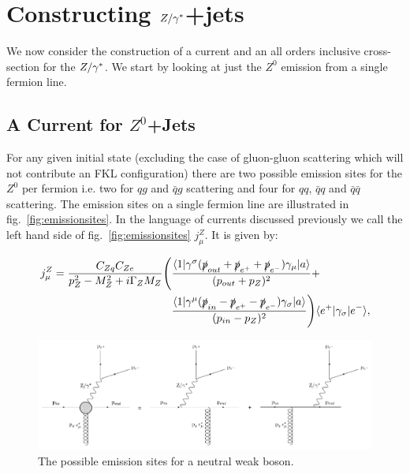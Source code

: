 \section{Constructing $Z/\gamma^*$+jets}
	\label{sec:Zcurrents}

	We now consider the construction of a current and an all orders
	inclusive cross-section for the $Z/\gamma^*$.  We start by looking at just
	the $Z^0$ emission from a single fermion line.

	\subsection{A Current for $Z^0$+Jets}
		\label{sub:zCurrent}

		For any given initial state (excluding the case of gluon-gluon scattering which will
		not contribute an FKL configuration) there are two possible emission sites for the
		$Z^0$ per fermion i.e. two for $qg$ and $\bar qg$ scattering and four for $qq$,
		$\bar qq$ and $\bar q\bar q$ scattering. The emission sites on a single fermion line
		are illustrated in fig.~\eqref{fig:emissionsites}.  In the language of currents discussed
		previously we call the left hand side of fig.~\eqref{fig:emissionsites} $j_\mu^{Z}$.
		It is given by:

		\begin{align}
		  \begin{split}
		    j^Z_\mu = \frac{C_{Zq}C_{Ze}}{p_Z^2 - M^2_Z +
		      i\Gamma_ZM_Z}\Bigg(&\frac{\langle 1 | \gamma^{\sigma}(\slashed p_{out} + \slashed
		        p_{e^+} + \slashed p_{e^-})\gamma_{\mu} | a \rangle}{(p_{out} + p_Z)^2} + \\
		    &\frac{\langle 1 | \gamma^{\mu}(\slashed p_{in} - \slashed p_{e^+} - \slashed
		        p_{e^-})\gamma_{\sigma} | a \rangle}{(p_{in} - p_Z)^2}\Bigg)\langle e^+ | \gamma_{\sigma} | e^- \rangle,
		    \label{eqn:Zcurrent}
		  \end{split}
		\end{align}

		\begin{figure}[bt]
			\includegraphics[width=0.98\linewidth]{figures/EmissionSites.pdf}
			\caption{The possible emission sites for a neutral weak boson.}
			\label{fig:emissionsites}
		\end{figure}

